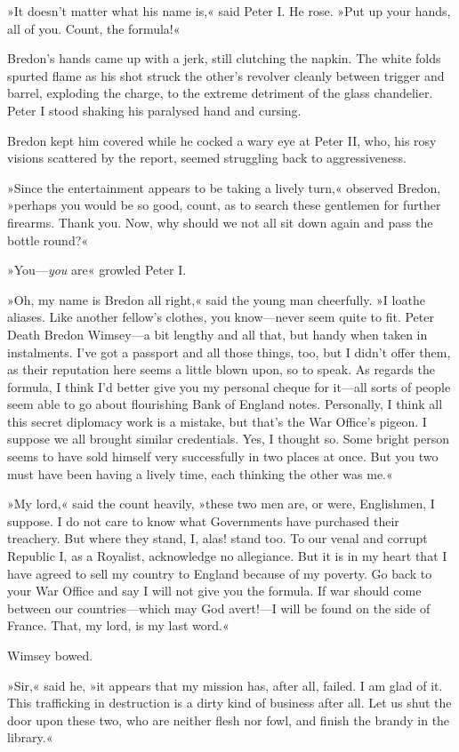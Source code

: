 »It doesn't matter what his name is,« said Peter I. He rose. »Put up your hands, all of you. Count, the formula!«

Bredon's hands came up with a jerk, still clutching the napkin. The white folds spurted flame as his shot struck the other's revolver cleanly between trigger and barrel, exploding the charge, to the extreme detriment of the glass chandelier. Peter I stood shaking his paralysed hand and cursing.

Bredon kept him covered while he cocked a wary eye at Peter II, who, his rosy visions scattered by the report, seemed struggling back to aggressiveness.

»Since the entertainment appears to be taking a lively turn,« observed Bredon, »perhaps you would be so good, count, as to search these gentlemen for further firearms. Thank you. Now, why should we not all sit down again and pass the bottle round?«

»You—\textit{you} are\longdash« growled Peter I.

»Oh, my name is Bredon all right,« said the young man cheerfully. »I loathe aliases. Like another fellow's clothes, you know—never seem quite to fit. Peter Death Bredon Wimsey—a bit lengthy and all that, but handy when taken in instalments. I've got a passport and all those things, too, but I didn't offer them, as their reputation here seems a little blown upon, so to speak. As regards the formula, I think I'd better give you my personal cheque for it—all sorts of people seem able to go about flourishing Bank of England notes. Personally, I think all this secret diplomacy work is a mistake, but that's the War Office's pigeon. I suppose we all brought similar credentials. Yes, I thought so. Some bright person seems to have sold himself very successfully in two places at once. But you two must have been having a lively time, each thinking the other was me.«

»My lord,« said the count heavily, »these two men are, or were, Englishmen, I suppose. I do not care to know what Governments have purchased their treachery. But where they stand, I, alas! stand too. To our venal and corrupt Republic I, as a Royalist, acknowledge no allegiance. But it is in my heart that I have agreed to sell my country to England because of my poverty. Go back to your War Office and say I will not give you the formula. If war should come between our countries—which may God avert!—I will be found on the side of France. That, my lord, is my last word.«

Wimsey bowed.

»Sir,« said he, »it appears that my mission has, after all, failed. I am glad of it. This trafficking in destruction is a dirty kind of business after all. Let us shut the door upon these two, who are neither flesh nor fowl, and finish the brandy in the library.«